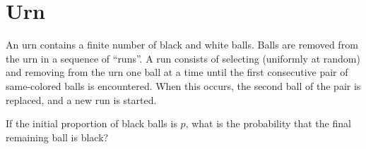 \documentclass[12pt]{article}
\begin{document}
\section{Urn}


\begin{mdframed}
  An urn contains a finite number of black and white balls. Balls are removed from the urn in a
  sequence of ``runs''. A run consists of selecting (uniformly at random) and removing from the urn
  one ball at a time until the first consecutive pair of same-colored balls is encountered. When
  this occurs, the second ball of the pair is replaced, and a new run is started.

  If the initial proportion of black balls is $p$, what is the probability that the final remaining
  ball is black?
\end{mdframed}



\end{document}
